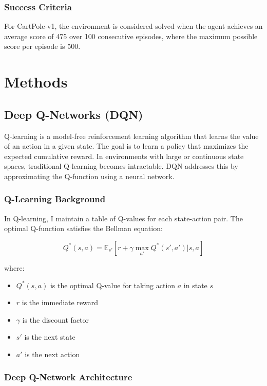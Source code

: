 \documentclass[11pt,a4paper]{article}
\begin{document}
\subsubsection{Success Criteria}
For CartPole-v1, the environment is considered solved when the agent achieves an average score of 475 over 100 consecutive episodes, where the maximum possible score per episode is 500.

\section{Methods}

\subsection{Deep Q-Networks (DQN)}

Q-learning is a model-free reinforcement learning algorithm that learns the value of an action in a given state. The goal is to learn a policy that maximizes the expected cumulative reward. In environments with large or continuous state spaces, traditional Q-learning becomes intractable. DQN addresses this by approximating the Q-function using a neural network.

\subsubsection{Q-Learning Background}

In Q-learning, I maintain a table of Q-values for each state-action pair. The optimal Q-function satisfies the Bellman equation:

\begin{equation}
    Q^*(s,a) = \mathbb{E}_{s'} \left[ r + \gamma \max_{a'} Q^*(s',a') | s, a \right]
\end{equation}

where:
\begin{itemize}
    \item $Q^*(s,a)$ is the optimal Q-value for taking action $a$ in state $s$
    \item $r$ is the immediate reward
    \item $\gamma$ is the discount factor
    \item $s'$ is the next state
    \item $a'$ is the next action
\end{itemize}

\subsubsection{Deep Q-Network Architecture}
\end{document}
